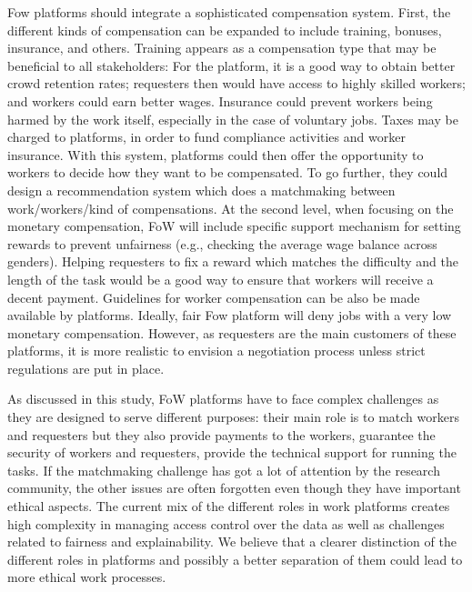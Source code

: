 \documentclass[11pt]{article}
\begin{document}
Fow platforms should integrate a sophisticated compensation system. First, the different kinds of compensation can be expanded to include training, bonuses, insurance, and others. Training appears as a compensation type that may be beneficial to all stakeholders: For the platform, it is a good way to obtain better crowd retention rates; requesters then would have access to highly skilled workers; and workers could earn better wages. 
% 
Insurance could prevent workers being harmed by the work itself, especially in the case of voluntary jobs. Taxes may be charged to platforms, in order to fund compliance activities and worker insurance. With this system, platforms could then offer the opportunity to workers to decide how they want to be compensated. To go further, they could design a recommendation system which does a matchmaking between work/workers/kind of compensations. At the second level, when focusing on the monetary compensation, FoW will include specific support mechanism for setting rewards  to prevent unfairness (e.g., checking the average wage balance across genders). Helping requesters to fix a reward  which matches  the difficulty and the length of the task would be a good way to ensure that workers will receive a decent payment. Guidelines for worker compensation can be also be made available by platforms. Ideally, fair Fow platform will deny jobs with a very low monetary compensation. However, as requesters are the main customers of these platforms, it is more realistic to envision a negotiation process unless strict regulations are put in place. 


As discussed in this study, FoW platforms have to face complex challenges as they are designed to serve different purposes: their main role is to match workers and requesters but they also provide payments to the workers, guarantee the security of workers and requesters, provide the technical support for running the tasks. If the matchmaking challenge has got a lot of attention by the research community, the other issues are often forgotten even though they have important ethical aspects. The current mix of the different roles in  work platforms creates high complexity in managing access control over the data as well as challenges related to  fairness and explainability. We believe that a clearer distinction of the different roles in platforms and possibly a better separation of them could lead to more ethical work processes.


\end{document}
